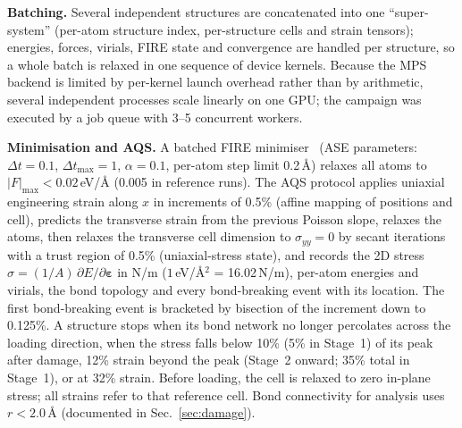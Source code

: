 \textbf{Batching.} Several independent structures are concatenated into one ``super-system'' (per-atom structure index, per-structure cells and strain tensors); energies, forces, virials, FIRE state and convergence are handled per structure, so a whole batch is relaxed in one sequence of device kernels. Because the MPS backend is limited by per-kernel launch overhead rather than by arithmetic, several independent processes scale linearly on one GPU; the campaign was executed by a job queue with 3--5 concurrent workers.

\textbf{Minimisation and AQS.} A batched FIRE minimiser~\cite{bitzek2006} (ASE parameters: $\Delta t=0.1$, $\Delta t_\mathrm{max}=1$, $\alpha=0.1$, per-atom step limit 0.2\,\AA) relaxes all atoms to $|F|_\mathrm{max}<0.02$\,eV/\AA{} (0.005 in reference runs). The AQS protocol applies uniaxial engineering strain along $x$ in increments of 0.5\% (affine mapping of positions and cell), predicts the transverse strain from the previous Poisson slope, relaxes the atoms, then relaxes the transverse cell dimension to $\sigma_{yy}=0$ by secant iterations with a trust region of 0.5\% (uniaxial-stress state), and records the 2D stress $\sigma=(1/A)\,\partial E/\partial\boldsymbol\varepsilon$ in N/m ($1$\,eV/\AA$^2$ = 16.02\,N/m), per-atom energies and virials, the bond topology and every bond-breaking event with its location. The first bond-breaking event is bracketed by bisection of the increment down to 0.125\%. A structure stops when its bond network no longer percolates across the loading direction, when the stress falls below 10\% (5\% in Stage~1) of its peak after damage, 12\% strain beyond the peak (Stage~2 onward; 35\% total in Stage~1), or at 32\% strain. Before loading, the cell is relaxed to zero in-plane stress; all strains refer to that reference cell. Bond connectivity for analysis uses $r<2.0$\,\AA{} (documented in Sec.~\ref{sec:damage}).

